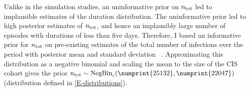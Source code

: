 \documentclass[thesis.tex]{subfiles}
\begin{document}
Unlike in the simulation studies, an uninformative prior on $n_\text{tot}$ led to implausible estimates of the duration distribution.
The uninformative prior led to high posterior estimates of $n_\text{tot}$, and hence an implausibly large number of episodes with durations of less than five days.
Therefore, I based an informative prior for $n_\text{tot}$ on pre-existing estimates of the total number of infections over the period with posterior mean  and standard deviation ~\autocite{birrellRTM2}.
Approximating this distribution as a negative binomial and scaling the mean to the size of the CIS cohort gives the prior $\ntot \sim \NBc(\numprint{25132}, \numprint{22047})$ (distribution defined in \cref{E-distributions}).
\end{document}
